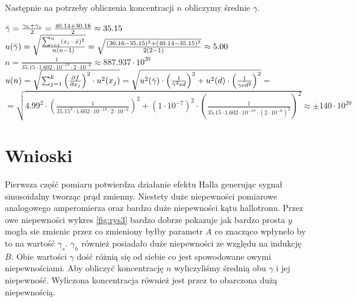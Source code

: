 \documentclass{article}
\begin{document}
Następnie na potrzeby obliczenia koncentracji $n$ obliczymy średnie $\gamma$.\\
\begin{flushleft}
    $\Bar{\gamma}=\frac{\gamma_{h}+\gamma_{s}}{2}=\frac{40.14+30.16}{2}\approx35.15$\\
    \vspace{2.5ex}
    $u(\Bar{\gamma})=\sqrt{\frac{\sum^{n}_{i=1}(x_{i}-\Bar{x})^{2}}{n(n-1)}}=\sqrt{\frac{(30.16-35.15)^{2}+(40.14-35.15)^{2}}{2(2-1)}}\approx 5.00$\\
    \vspace{2.5ex}
    $n=\frac{1}{35.15\cdot1.602\cdot10^{-19}\cdot2\cdot10^{-6}}\approx 887.937\cdot10^{20}$\\
    \vspace{2.5ex}
    $u(n)=\sqrt{\sum^{k}_{j=1}\left(\frac{\partial f}{\partial x_{j}}\right)^{2}\cdot u^{2}(x_{j})}=\sqrt{u^{2}(\Bar{\gamma})\cdot\left(\frac{1}{\Bar{\gamma}^{2}ed}\right)^{2}+u^{2}(d)\cdot\left(\frac{1}{\Bar{\gamma e d^{2}}}\right)^{2}}=$\\
    $=\sqrt{4.99^{2}\cdot\left(\frac{1}{35.15^{2}\cdot1.602\cdot10^{-19}\cdot2\cdot10^{-6}}\right)^{2}+(1\cdot10^{-7})^{2}\cdot\left(\frac{1}{35.15\cdot 1.602\cdot10^{-19}\cdot (2\cdot10^{-6})^{2}}\right)^{2}}\approx \pm140\cdot10^{20}$\\
\end{flushleft}


\section{Wnioski}
Pierwsza część pomiaru potwierdza działanie efektu Halla generując sygnał sinusoidalny tworząc prąd zmienny. Niestety duże niepewności pomiarowe analogowego amperomierza oraz bardzo duże niepewności kątu hallotronu. Przez owe niepewności wykres \ref{fig:rys3} bardzo dobrze pokazuje jak bardzo prosta $y$ mogła sie zmienic przez co zmieniony byłby parametr $A$ co znacząco wpłyneło by to na wartość $\gamma_{s}$. $\gamma_{h}$ również posiadało duże niepewności ze względu na indukcję $B$. Obie wartości $\gamma$ dość różnią się od siebie co jest spowodowane owymi niepewnościami. Aby obliczyć koncentrację $n$ wyliczyliśmy średnią obu $\gamma$ i jej niepewność. Wyliczona koncentracja również jest przez to obarczona dużą niepewnością.
\end{document}
